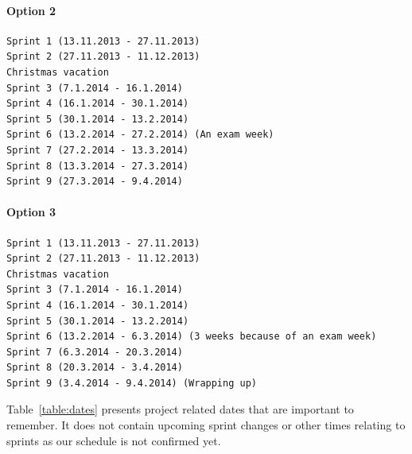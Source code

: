 \paragraph{Option 2}

\begin{verbatim}
Sprint 1 (13.11.2013 - 27.11.2013)
Sprint 2 (27.11.2013 - 11.12.2013)
Christmas vacation
Sprint 3 (7.1.2014 - 16.1.2014)
Sprint 4 (16.1.2014 - 30.1.2014)
Sprint 5 (30.1.2014 - 13.2.2014)
Sprint 6 (13.2.2014 - 27.2.2014) (An exam week)
Sprint 7 (27.2.2014 - 13.3.2014)
Sprint 8 (13.3.2014 - 27.3.2014)
Sprint 9 (27.3.2014 - 9.4.2014)
\end{verbatim}

\paragraph{Option 3}

\begin{verbatim}
Sprint 1 (13.11.2013 - 27.11.2013)
Sprint 2 (27.11.2013 - 11.12.2013)
Christmas vacation
Sprint 3 (7.1.2014 - 16.1.2014)
Sprint 4 (16.1.2014 - 30.1.2014)
Sprint 5 (30.1.2014 - 13.2.2014)
Sprint 6 (13.2.2014 - 6.3.2014) (3 weeks because of an exam week)
Sprint 7 (6.3.2014 - 20.3.2014)
Sprint 8 (20.3.2014 - 3.4.2014)
Sprint 9 (3.4.2014 - 9.4.2014) (Wrapping up) 
\end{verbatim}

Table~\ref{table:dates} presents project related dates that are important to
remember. It does not contain upcoming sprint changes or other times relating to
sprints as our schedule is not confirmed yet.

